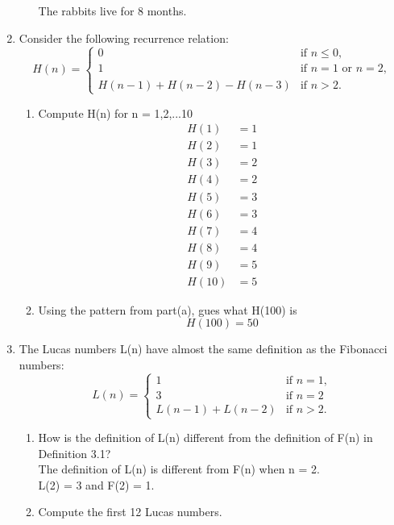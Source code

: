 \documentclass[12pt]{article}
\begin{document}
\begin{enumerate}
\begin{enumerate}
        The rabbits live for 8 months.
    \end{enumerate}
    \newpage
    \item Consider the following recurrence relation:
    \[
    H(n) = 
    \begin{cases} 
    0 & \text{if } n \leq 0, \\
    1 & \text{if } n = 1 \text{ or } n = 2, \\
    H(n - 1) + H(n - 2) - H(n - 3) & \text{if } n > 2.
    \end{cases}
    \]
    \begin{enumerate}
        \item Compute H(n) for n = 1,2,...10
        \begin{align*}
            H(1) &= 1\\
            H(2) &= 1\\
            H(3) &= 2\\
            H(4) &= 2\\
            H(5) &= 3\\
            H(6) &= 3\\
            H(7) &= 4\\
            H(8) &= 4\\
            H(9) &= 5\\
            H(10) &= 5
        \end{align*}
        \item Using the pattern from part(a), gues what H(100) is
            \[H(100) = 50\]
    \end{enumerate}
    \item The Lucas numbers L(n) have almost the same definition as the Fibonacci numbers:
    \[
    L(n) = 
    \begin{cases} 
    1 &     \text{if } n = 1, \\
    3 & \text{if } n = 2 \\
    L(n - 1) + L(n - 2) & \text{if } n > 2.
    \end{cases}
    \]
    \begin{enumerate}
        \item How is the definition of L(n) different from the definition of F(n) in Definition 3.1?\\
        The definition of L(n) is different from F(n) when n = 2. \\ L(2) = 3 and F(2) = 1.
        \item Compute the first 12 Lucas numbers.
        \begin{align*}

\end{align*}
\end{enumerate}
\end{enumerate}
\end{document}

